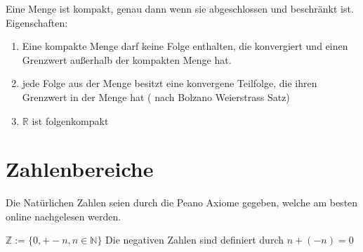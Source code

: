 \documentclass[headsepline,12pt,a4paper]{scrartcl}
\makeatletter
\def\myItem{%
   \@ifnextchar[ \@myItem{\@noitemargtrue\@myItem[\@itemlabel]}}
\def\@myItem[#1]{\item[#1]\mbox{}\\}
\makeatother
\begin{document}
\begin{itemize}
\myItem[Kompaktheit]

Eine Menge ist kompakt, genau dann wenn sie abgeschlossen und beschränkt ist. \\

Eigenschaften: \\
\begin{enumerate}
\item Eine kompakte Menge darf keine Folge enthalten, die konvergiert und einen Grenzwert außerhalb der kompakten Menge hat. \\
\item jede Folge aus der Menge besitzt eine konvergene Teilfolge, die ihren Grenzwert in der Menge hat ( nach Bolzano Weierstrass Satz) 
\item $\mathbb{R}$ ist folgenkompakt
\end{enumerate}

\end{itemize}

\section*{Zahlenbereiche}




\itemize
\item


\item Die Natürlichen Zahlen seien durch die Peano Axiome gegeben, welche am besten online nachgelesen werden.
\item $\mathbb{Z} := \{0, +-n , n \in \mathbb{N}\} $ Die negativen Zahlen sind definiert durch $n+(-n)=0$
\end{document}
